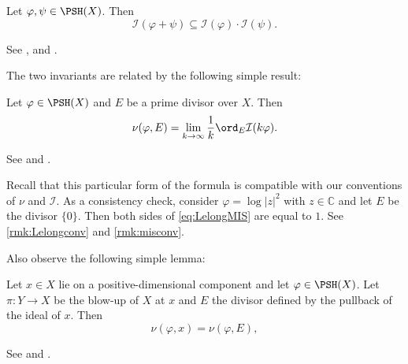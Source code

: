 \begin{theorem}\label{thm:multipsubadd}
    Let $\varphi,\psi\in \PSH(X)$. Then
    \[
        \mathcal{I}(\varphi+\psi)\subseteq \mathcal{I}(\varphi)\cdot \mathcal{I}(\psi).
    \]
\end{theorem}
See \cite{DEL00}, \cite[Theorem~14.2]{Dem12} and \cite[Theorem~12.4.1]{FPT}.

The two invariants are related by the following simple result:
\begin{proposition}\label{prop:Lelongnumfrommis}
    Let $\varphi\in \PSH(X)$ and $E$ be a prime divisor over $X$. Then
    \begin{equation}\label{eq:LelongMIS}
        \nu(\varphi,E)=\lim_{k\to\infty}\frac{1}{k}\ord_E\mathcal{I}(k\varphi).
    \end{equation}
\end{proposition}
See \cite[Proposition~2.14]{DX21} and \cite[Corollary~12.6.8]{FPT}.

Recall that this particular form of the formula is compatible with our conventions of $\nu$ and $\mathcal{I}$. As a consistency check, consider $\varphi=\log |z|^2$ with $z\in \mathbb{C}$ and let $E$ be the divisor $\{0\}$. Then both sides of \eqref{eq:LelongMIS} are equal to $1$. See \cref{rmk:Lelongconv} and \cref{rmk:misconv}.

Also observe the following simple lemma:
\begin{lemma}\label{lma:blowupLelong}
    Let $x \in X$ lie on a positive-dimensional component and let $\varphi\in \PSH(X)$. Let $\pi\colon Y\rightarrow X$ be the blow-up of $X$ at $x$ and $E$ the divisor defined by the pullback of the ideal of $x$.
    Then
    \[
        \nu(\varphi,x)=\nu(\varphi,E),
    \]
\end{lemma}
See \cite[Corollaire~1.1.8]{Bou02} and \cite[Proposition~12.3.6]{FPT}.

